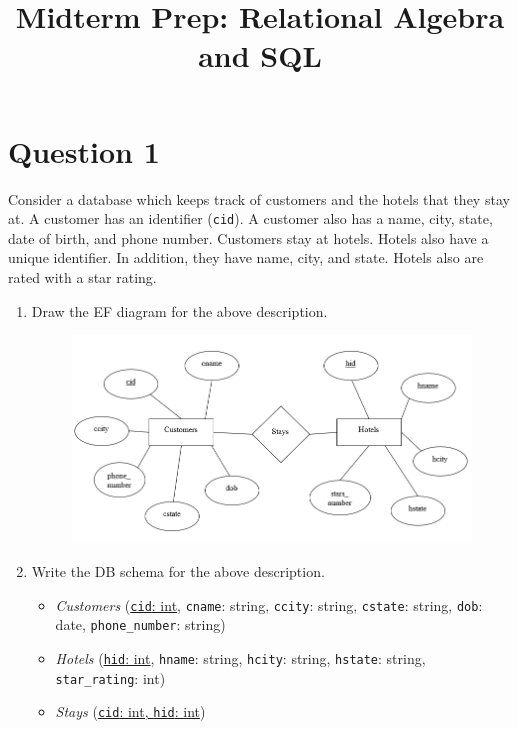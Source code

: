 \documentclass[letterpaper, 11pt]{article}
\title{Midterm Prep: Relational Algebra and SQL}
\author{}
\date{}
\begin{document}
\maketitle

\vspace{-4em}

\section*{Question 1}

Consider a database which keeps track of customers and the hotels that they stay at. A customer has an identifier (\texttt{cid}). A customer also has a name, city, state, date of birth, and phone number. Customers stay at hotels. Hotels also have a unique identifier. In addition, they have name, city, and state. Hotels also are rated with a star rating.

\begin{enumerate}[label={\alph*}.,leftmargin=*]
    \item Draw the EF diagram for the above description.
    \begin{tcolorbox}
    \begin{figure}[H]
        \centering
        \includegraphics[scale=0.8]{midterm-1a.png}
    \end{figure}
    \end{tcolorbox}
    \item Write the DB schema for the above description.
    \begin{tcolorbox}
    \begin{itemize}[leftmargin=*]
        \item \textit{Customers} (\ul{\texttt{cid}: int}, \texttt{cname}: string, \texttt{ccity}: string, \texttt{cstate}: string, \texttt{dob}: date, \texttt{phone\_number}: string)
        \item \textit{Hotels} (\ul{\texttt{hid}: int}, \texttt{hname}: string, \texttt{hcity}: string, \texttt{hstate}: string, \texttt{star\_rating}: int)
        \item \textit{Stays} (\ul{\texttt{cid}: int, \texttt{hid}: int})
    \end{itemize}
    \end{tcolorbox}
\end{enumerate}
\end{document}
